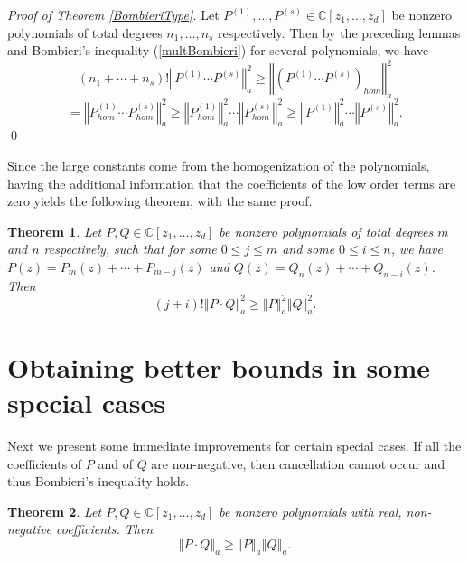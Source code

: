 \documentclass[12pt]{amsart}
\newtheorem{theorem}{Theorem}
\begin{document}
{\em Proof of Theorem \ref{BombieriType}.}  Let $P^{(1)} ,\dots ,  P^{(s)}  \in \mathbb{C}[z_{1},\dots,z_{d}]$ be nonzero 
	polynomials of  total degrees $n_1, \dots , n_s$ respectively.
  Then by the preceding lemmas and Bombieri's inequality (\ref{multBombieri}) for several polynomials, we have
	$$
	(n_1 +  \cdots + n_s)! \left\Vert P^{(1)} \cdots   P^{(s)} \right\Vert _{a}^{2}
\ge
\left\Vert \left(P^{(1)} \cdots P^{(s)}\right)_{hom} \right\Vert _{a}^{2}
$$
$$
=
\left\Vert P^{(1)}_{hom} \cdots P^{(s)}_{hom} \right\Vert _{a}^{2}
\ge
\left\Vert P^{(1)}_{hom} \right\Vert _{a}^{2} \cdots \left\Vert P^{(s)}_{hom} \right\Vert _{a}^{2}
\ge
\left\Vert P^{(1)} \right\Vert _{a}^{2} \cdots \left\Vert P^{(s)} \right\Vert _{a}^{2}.
$$
\qed		

Since the large constants come from the homogenization of the polynomials, having the additional information that the coefficients of the low order terms are zero yields the following theorem, with the same proof. 


\begin{theorem} \label{BombieriTypebis}
	Let $P , Q\in \mathbb{C}[z_{1},\dots,z_{d}]$ be nonzero 
	polynomials of   total degrees $m$ and $n$ respectively, such that for some $0\le j \le m$ and some $0\le i \le n$, we have   $P\left( z \right) =P_{m}\left( z \right) +\cdots +P_{m -j}\left( z \right)$ and
$Q\left( z \right) = Q_{n}\left( z \right) +\cdots +Q_{n-i}\left( z \right)$.
Then
\[
(j + i)! \left\Vert P \cdot   Q \right\Vert _{a}^{2}
\ge
\left\Vert P \right\Vert _{a}^{2}   \left\Vert Q \right\Vert _{a}^{2}.
\]		
\end{theorem}




\section{Obtaining better bounds in some special cases}

Next we present some immediate improvements for certain special cases. If all the coefficients of $P$ and of $Q$ are non-negative, then cancellation cannot occur and thus Bombieri's inequality holds.

\begin{theorem} \label{BombieriPos}
	Let $P , Q  \in \mathbb{C}[z_{1},\dots,z_{d}]$ be nonzero 
	polynomials with real, non-negative coefficients. Then
	\[
\left\Vert P \cdot Q \right\Vert _{a}
\ge
\left\Vert P \right\Vert _{a}  \left\Vert Q \right\Vert _{a}.
\]		
\end{theorem}
\end{document}
